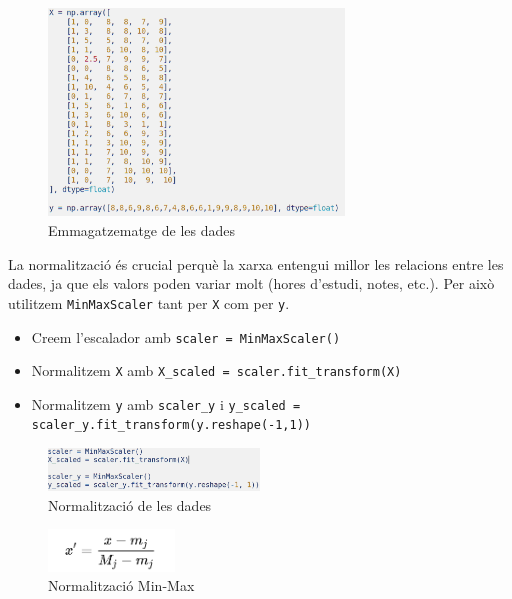 \begin{figure}[h!]
\centering
\includegraphics[width=0.7\textwidth]{./figures/23.png}
\caption{Emmagatzematge de les dades}
\end{figure}

La normalització és crucial perquè la xarxa entengui millor les relacions entre les dades, ja que els valors poden variar molt (hores d’estudi, notes, etc.). Per això utilitzem \texttt{MinMaxScaler} tant per \texttt{X} com per \texttt{y}.

\begin{itemize}
\item Creem l’escalador amb \texttt{scaler = MinMaxScaler()}
\item Normalitzem \texttt{X} amb \texttt{X\_scaled = scaler.fit\_transform(X)}
\item Normalitzem \texttt{y} amb \texttt{scaler\_y} i \texttt{y\_scaled = scaler\_y.fit\_transform(y.reshape(-1,1))}
\end{itemize}

\begin{figure}[H]
\centering
\includegraphics[width=0.5\textwidth]{./figures/24.png}
\caption{Normalització de les dades}
\end{figure}

\begin{figure}[h!]
\centering
\includegraphics[width=0.3\textwidth]{./figures/25.png}
\caption{Normalització Min-Max\cite{Min-Max}}
\end{figure}

